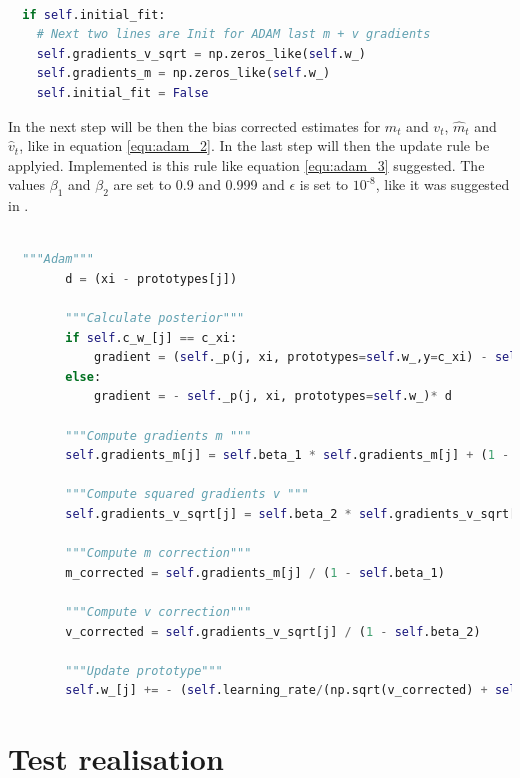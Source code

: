 \documentclass[12pt,oneside,a4paper,parskip]{scrbook}
\begin{document}
\begin{lstlisting}[label=lst:adam,
  language=python,
  firstnumber=1,
  caption= Modification of the \texttt{\_optimize} method to initialize $m_t$ and $v_t$.]			   

  if self.initial_fit:
    # Next two lines are Init for ADAM last m + v gradients
    self.gradients_v_sqrt = np.zeros_like(self.w_)
    self.gradients_m = np.zeros_like(self.w_)
    self.initial_fit = False
\end{lstlisting}

In the next step will be then the bias corrected estimates for $m_t$ and $v_t$, $\hat{m}_t$ and $\hat{v}_t$,
like in equation \ref{equ:adam_2}. 
In the last step will then the update rule be applyied. Implemented is this rule like equation \ref{equ:adam_3} suggested.
The values $\beta_1$ and $\beta_2$ are set to 0.9 and 0.999 and $\epsilon$ is set to $10^\textit{-8}$, like it was suggested in \cite{overvieDiffRSLVQ, Kingma2014AdamAM}.

\begin{lstlisting}[label=lst:adam,
  language=python,
  firstnumber=1,
  caption= Implementation of Adam on basis of \cite{PassiveDriftonRSLVQ}.]			   

  """Adam"""
        d = (xi - prototypes[j])

        """Calculate posterior"""
        if self.c_w_[j] == c_xi:
            gradient = (self._p(j, xi, prototypes=self.w_,y=c_xi) - self._p(j, xi, prototypes=self.w_))* d
        else:
            gradient = - self._p(j, xi, prototypes=self.w_)* d

        """Compute gradients m """
        self.gradients_m[j] = self.beta_1 * self.gradients_m[j] + (1 - self.beta_1) * gradient

        """Compute squared gradients v """
        self.gradients_v_sqrt[j] = self.beta_2 * self.gradients_v_sqrt[j] + (1 - self.beta_2) * gradient ** 2 

        """Compute m correction"""
        m_corrected = self.gradients_m[j] / (1 - self.beta_1)

        """Compute v correction"""
        v_corrected = self.gradients_v_sqrt[j] / (1 - self.beta_2)

        """Update prototype"""
        self.w_[j] += - (self.learning_rate/(np.sqrt(v_corrected) + self.epsilon ))*m_corrected
\end{lstlisting}

\chapter{Test realisation}
\end{document}
